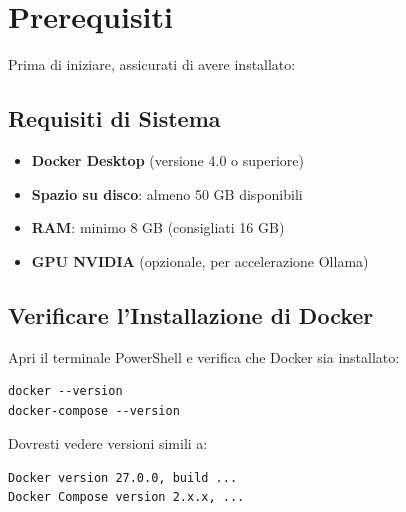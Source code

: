 \section{Prerequisiti}

Prima di iniziare, assicurati di avere installato:

\subsection{Requisiti di Sistema}

\begin{itemize}
    \item \textbf{Docker Desktop} (versione 4.0 o superiore)
    \item \textbf{Spazio su disco}: almeno 50 GB disponibili
    \item \textbf{RAM}: minimo 8 GB (consigliati 16 GB)
    \item \textbf{GPU NVIDIA} (opzionale, per accelerazione Ollama)
\end{itemize}

\subsection{Verificare l'Installazione di Docker}

Apri il terminale PowerShell e verifica che Docker sia installato:

\begin{lstlisting}
docker --version
docker-compose --version
\end{lstlisting}

Dovresti vedere versioni simili a:
\begin{lstlisting}
Docker version 27.0.0, build ...
Docker Compose version 2.x.x, ...
\end{lstlisting}
